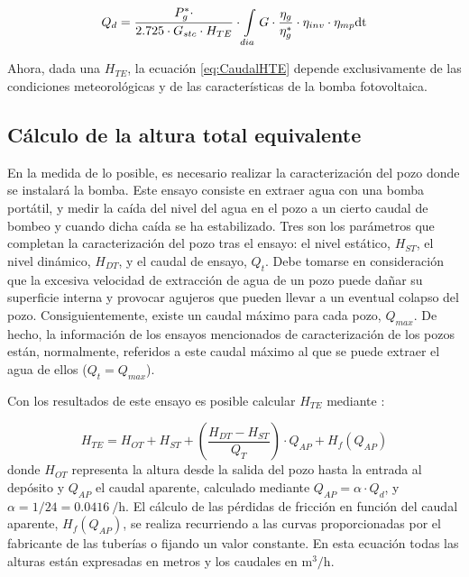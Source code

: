 \begin{equation}
Q_{d}=\frac{P_{g}^{*}\cdot}{2.725\cdot G_{stc}\cdot H_{TE}}\cdot\intop_{dia}G\cdot\frac{\eta_{g}}{\eta_{g}^{*}}\cdot\eta_{inv}\cdot\eta_{mp}\mathrm{dt}\label{eq:CaudalHTE}\end{equation}


Ahora, dada una $H_{TE}$, la ecuación \ref{eq:CaudalHTE} depende
exclusivamente de las condiciones meteorológicas y de las características
de la bomba fotovoltaica. 


\subsection{Cálculo de la altura total equivalente}

En la medida de lo posible, es necesario realizar la caracterización
del pozo donde se instalará la bomba. Este ensayo consiste en extraer
agua con una bomba portátil, y medir la caída del nivel del agua en
el pozo a un cierto caudal de bombeo y cuando dicha caída se ha estabilizado.
Tres son los parámetros que completan la caracterización del pozo
tras el ensayo: el nivel estático, $H_{ST}$, el nivel dinámico, $H_{DT}$,
y el caudal de ensayo, $Q_{t}$.
Debe tomarse en consideración que la excesiva velocidad de extracción
de agua de un pozo puede dañar su superficie interna y provocar agujeros
que pueden llevar a un eventual colapso del pozo. Consiguientemente,
existe un caudal máximo para cada pozo, $Q_{max}$.
De hecho, la información de los ensayos mencionados de caracterización
de los pozos están, normalmente, referidos a este caudal máximo al
que se puede extraer el agua de ellos ($Q_{t}=Q_{max}$). 

Con los resultados de este ensayo es posible calcular $H_{TE}$ mediante
\cite{Narvarte2001}:

\begin{equation}
H_{TE}=H_{OT}+H_{ST}+(\frac{H_{DT}-H_{ST}}{Q_{T}})\cdot Q_{AP}+H_{f}(Q_{AP})\end{equation}
donde $H_{OT}$
representa la altura desde la salida del pozo hasta la entrada al
depósito y $Q_{AP}$
el caudal aparente, calculado mediante $Q_{AP}=\alpha\cdot Q_{d}$,
y $\alpha=1 / 24 = \SI{0.0416}{\per\hour}$. El cálculo de las
pérdidas de fricción en función del caudal aparente, $H_{f}(Q_{AP})$,
se realiza recurriendo a las curvas proporcionadas por el fabricante
de las tuberías o fijando un valor constante. En esta ecuación todas
las alturas están expresadas en metros y los caudales en $\si{\meter\cubed\per\hour}$.


